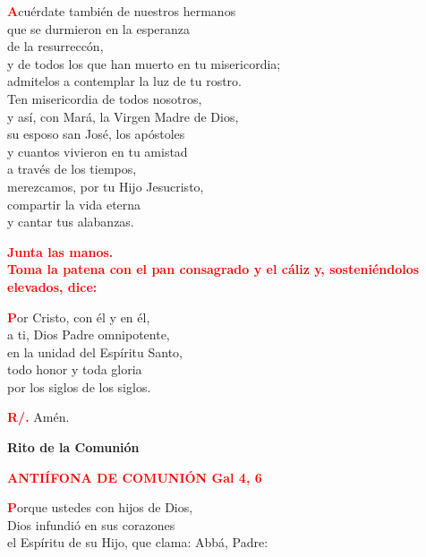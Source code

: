 \documentclass[12pt, letterpaper, spanish]{report}
\begin{document}
\lettrine{\bfseries \textcolor{red}{A}}{}cu\'erdate tambi\'en de nuestros hermanos\\
que se durmieron en la esperanza\\
de la resurrecc\'on,\\
y de todos los que han muerto en tu misericordia;\\
admitelos a contemplar la luz de tu rostro.\\
Ten misericordia de todos nosotros,\\
y as\'i, con Mar\'a, la Virgen Madre de Dios,\\
su esposo san Jos\'e, los ap\'ostoles\\
y cuantos vivieron en tu amistad\\
a trav\'es de los tiempos,\\
merezcamos, por tu Hijo Jesucristo,\\
compartir la vida eterna\\
y cantar tus alabanzas.\newline

\large{\bfseries \textcolor{red}{Junta las manos.\\
Toma la patena con el pan consagrado y el c\'aliz y, sosteni\'endolos elevados, dice:}} \newline

\lettrine{\bfseries \textcolor{red}{P}}{}or Cristo, con \'el y en \'el,\\
a ti, Dios Padre omnipotente,\\
en la unidad del Esp\'iritu Santo,\\
todo honor y toda gloria\\
por los siglos de los siglos.\newline

\Large \hspace{-0.9cm} {\bfseries \textcolor{red}{R/.}} \hspace{0.5cm} Am\'en.\newline

\newpage

\begin{center}
\Huge {\bfseries Rito de la Comuni\'on}
\end{center}

\Large {\bfseries \textcolor{red}{ANTI\'IFONA DE COMUNI\'ON \hspace{2cm} \large Gal 4, 6}} \newline

\Large \lettrine{\bfseries \textcolor{red}{P}}{}orque ustedes con hijos de Dios,\\
Dios infundi\'o en sus corazones\\
el Esp\'iritu de su Hijo, que clama: Abb\'a, Padre:\newline
\end{document}
